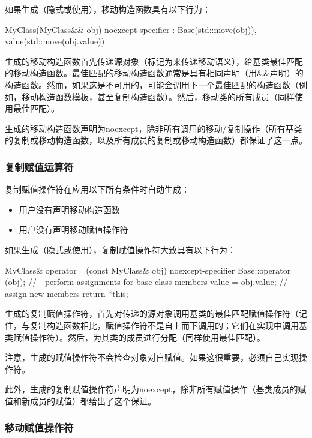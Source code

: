 如果生成（隐式或使用），移动构造函数具有以下行为：

\begin{cppcode}
MyClass(MyClass&& obj) noexcept-specifier
: Base(std::move(obj)), value(std::move(obj.value)) {
}
\end{cppcode}

生成的移动构造函数首先传递源对象（标记为来传递移动语义），给基类最佳匹配的移动构造函数。最佳匹配的移动构造函数通常是具有相同声明（用\&\&声明）的构造函数。然而，如果这是不可用的，可能会调用下一个最佳匹配的构造函数（例如，移动构造函数模板，甚至复制构造函数）。然后，移动类的所有成员（同样使用最佳匹配）。

生成的移动构造函数声明为noexcept，除非所有调用的移动/复制操作（所有基类的复制或移动构造函数，以及所有成员的复制或移动构造函数）都保证了这一点。

\subsubsection{复制赋值运算符}

复制赋值操作符在应用以下所有条件时自动生成：

\begin{itemize}
	\item 用户没有声明移动构造函数
	\item 用户没有声明移动赋值操作符
\end{itemize}

如果生成（隐式或使用），复制赋值操作符大致具有以下行为：

\begin{cppcode}
MyClass& operator= (const MyClass& obj) noexcept-specifier {
	Base::operator=(obj); // - perform assignments for base class members
	value = obj.value; // - assign new members
	return *this;
}
\end{cppcode}

生成的复制赋值操作符，首先对传递的源对象调用基类的最佳匹配赋值操作符（记住，与复制构造函数相比，赋值操作符不是自上而下调用的；它们在实现中调用基类赋值操作符）。然后，为其类的成员进行分配（同样使用最佳匹配）。

注意，生成的赋值操作符不会检查对象对自赋值。如果这很重要，必须自己实现操作符。

此外，生成的复制赋值操作符声明为noexcept，除非所有赋值操作（基类成员的赋值和新成员的赋值）都给出了这个保证。

\subsubsection{移动赋值操作符}

